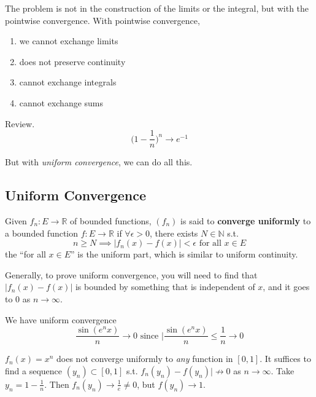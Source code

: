   The problem is not in the construction of the limits or the integral, but with the pointwise convergence. With pointwise convergence, 
  \begin{enumerate}
    \item we cannot exchange limits 
    \item does not preserve continuity 
    \item cannot exchange integrals 
    \item cannot exchange sums
  \end{enumerate}

  \begin{example}
    Review. 
    \begin{equation}
      \bigg( 1 - \frac{1}{n} \bigg)^n \to e^{-1}
    \end{equation}
  \end{example}

  But with \textit{uniform convergence}, we can do all this. 

\subsection{Uniform Convergence}

  \begin{definition}
    Given $f_n : E \to \mathbb{R}$ of bounded functions, $(f_n)$ is said to \textbf{converge uniformly} to a bounded function $f: E \to \mathbb{R}$ if $\forall \epsilon > 0$, there exists $N \in \mathbb{N}$ s.t. 
    \begin{equation}
      n \geq N \implies |f_n (x) - f(x) | < \epsilon \text{ for all } x \in E
    \end{equation}
    the ``for all $x \in E$'' is the uniform part, which is similar to uniform continuity. 
  \end{definition}

  Generally, to prove uniform convergence, you will need to find that $|f_n (x) - f(x)|$ is bounded by something that is independent of $x$, and it goes to $0$ as $n \to \infty$. 

  \begin{example}
    We have uniform convergence
    \begin{equation}
      \frac{\sin(e^n x)}{n} \to 0 \text{ since } \bigg| \frac{\sin(e^n x)}{n} \leq \frac{1}{n} \to 0
    \end{equation}
  \end{example}

  \begin{example}
    $f_n (x) = x^n$ does not converge uniformly to \textit{any} function in $[0, 1]$. It suffices to find a sequence $(y_n) \subset [0, 1]$ s.t. $f_n (y_n) - f(y_n)| \not\to 0$ as $n \to \infty$. Take $y_n = 1 - \frac{1}{n}$. Then $f_n (y_n) \to \frac{1}{e} \neq 0$, but $f(y_n) \to 1$. 
  \end{example}

